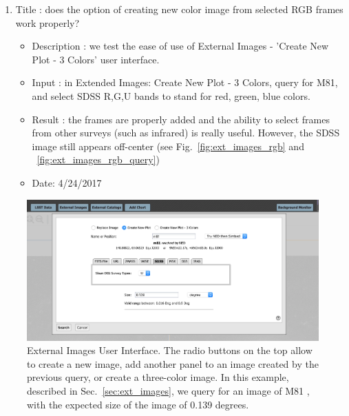\documentclass[DM,lsstdraft,toc]{lsstdoc}
\begin{document}
\begin{enumerate}
    \item Title : does the  option  of creating new color image from selected RGB frames work properly?
    \begin{itemize}
      \item Description : we test the ease of use of External Images - 'Create New Plot - 3 Colors' user interface.
      \item Input : in Extended Images: Create New Plot - 3 Colors,  query for M81, and select SDSS R,G,U bands to stand for red, green, blue colors.
      \item Result : the frames are properly added and the ability to select frames from other surveys (such as infrared) is really useful. However, the SDSS image still appears off-center (see Fig.~\ref{fig:ext_images_rgb} and ~\ref{fig:ext_images_rgb_query})
      \item Date: 4/24/2017
    \end{itemize}
\end{enumerate}


\begin{figure}
\includegraphics[width=\textwidth]{figs/external_images_menu.png}
\caption{External Images User Interface. The radio buttons on the top allow to create a new image, add another panel to an image created by the previous query, or create a three-color image. In this example, described in Sec.~\ref{sec:ext_images}, we query for an image of M81 , with the expected size of the image of 0.139 degrees. }
\label{fig:ext_images}
\end{figure}
\end{document}
